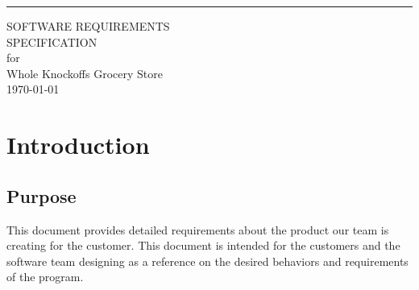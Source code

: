 \documentclass{scrreprt}
\date{}
\def\myversion{1.0 }
\begin{document}
\begin{flushright}
    \rule{16cm}{5pt}\vskip1cm
    \begin{bfseries}
        \Huge{SOFTWARE REQUIREMENTS\\ SPECIFICATION}\\
        \vspace{1.9cm}
        for\\
        \vspace{1.9cm}
        Whole Knockoffs Grocery Store\\
        \vspace{1.9cm}
        \today\\
    \end{bfseries}
\end{flushright}

\tableofcontents


%

\chapter{Introduction}

\section{Purpose}
This document provides detailed requirements about the product our team is creating for the customer.  This document is intended for the customers and the software team designing as a reference on the desired behaviors and requirements of the program.
\end{document}
